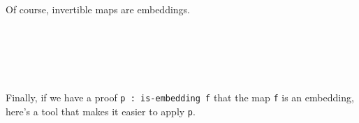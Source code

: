 Of course, invertible maps are embeddings.

\begin{code}%
\>[0]\<%
\\
\>[0][@{}l@{\AgdaIndent{1}}]%
\>[1]\AgdaSpace{}%
\AgdaSymbol{:}\AgdaSpace{}%
\AgdaSymbol{\{}\AgdaSpace{}%
\AgdaSymbol{:}\AgdaSpace{}%
\AgdaSpace{}%
\AgdaSpace{}%
\AgdaSymbol{\}}\AgdaSpace{}%
\AgdaSymbol{\{}\AgdaSpace{}%
\AgdaSymbol{:}\AgdaSpace{}%
\AgdaSpace{}%
\AgdaSpace{}%
\AgdaSymbol{\}(}\AgdaSpace{}%
\AgdaSymbol{:}\AgdaSpace{}%
\AgdaSpace{}%
\AgdaSpace{}%
\AgdaSymbol{)}\<%
\\
\>[1][@{}l@{\AgdaIndent{0}}]%
\>[2]%
\>[18]\AgdaSpace{}%
\AgdaSpace{}%
\AgdaSpace{}%
\AgdaSpace{}%
\<%
\\
%
\>[1]\AgdaSpace{}%
\AgdaSpace{}%
\AgdaSpace{}%
\AgdaSymbol{=}\AgdaSpace{}%
\AgdaSpace{}%
\AgdaSpace{}%
\AgdaSymbol{(}\AgdaSpace{}%
\AgdaSpace{}%
\AgdaSymbol{)}\<%
\\
\>[0]\<%
\end{code}

Finally, if we have a proof \texttt{p\ :\ is-embedding\ f} that the map \texttt{f} is an embedding, here's a tool that makes it easier to apply \texttt{p}.

